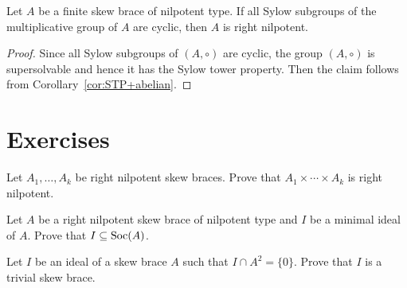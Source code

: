 \begin{corollary}
    Let $A$ be a finite skew brace of nilpotent type. 
    If all Sylow subgroups of the multiplicative
    group of $A$ are cyclic, then $A$ is right nilpotent.
\end{corollary}

\begin{proof}
    Since all Sylow subgroups of $(A,\circ)$ are cyclic, the group $(A,\circ)$ is supersolvable and hence
    it has the Sylow tower property. Then the claim follows from Corollary~\ref{cor:STP+abelian}.
\end{proof}


\section{Exercises}

\begin{prob}
     Let $A_1,\dots,A_k$ be right nilpotent skew braces. Prove that 
     $A_1\times\cdots\times A_k$ is right nilpotent.
\end{prob}

\begin{prob}
    Let $A$ be a right nilpotent skew brace of nilpotent type and $I$ be a
    minimal ideal of $A$. Prove that $I\subseteq\operatorname{Soc}(A)$.
\end{prob}

\begin{prob}
    Let $I$ be an ideal of a skew brace $A$ such that $I\cap A^2=\{0\}$. Prove that $I$
    is a trivial skew brace.
\end{prob}

\begin{prob}
\end{prob}

